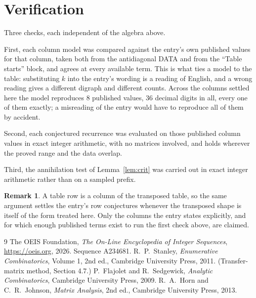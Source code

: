 \documentclass[11pt,a4paper]{article}
\theoremstyle{plain}
\theoremstyle{definition}
\newtheorem{remark}[theorem]{Remark}
\begin{document}
\section{Verification}

Three checks, each independent of the algebra above.

First, each column model was compared against the entry's own published values for that
column, taken both from the antidiagonal DATA and from the ``Table starts'' block, and agrees
at every available term. This is what ties a model to the table: substituting $k$ into the
entry's wording is a reading of English, and a wrong reading gives a different digraph and
different counts. Across the columns settled here the model reproduces $8$ published
values, $36$ decimal digits in all, every one of them exactly; a misreading of the entry
would have to reproduce all of them by accident.

Second, each conjectured recurrence was evaluated on those published column values in exact
integer arithmetic, with no matrices involved, and holds wherever the proved range and the
data overlap.

Third, the annihilation test of Lemma~\ref{lem:crit} was carried out in exact integer
arithmetic rather than on a sampled prefix.

\begin{remark}
A table row is a column of the transposed table, so the same argument settles the entry's row
conjectures whenever the transposed shape is itself of the form treated here. Only the columns
the entry states explicitly, and for which enough published terms exist to run the first check
above, are claimed.
\end{remark}

\begin{thebibliography}{9}
 The OEIS Foundation, \emph{The On-Line Encyclopedia of Integer
Sequences}, \url{https://oeis.org}, 2026. Sequence A234681.
 R.~P.~Stanley, \emph{Enumerative Combinatorics}, Volume 1, 2nd ed.,
Cambridge University Press, 2011. (Transfer-matrix method, Section 4.7.)
 P.~Flajolet and R.~Sedgewick, \emph{Analytic Combinatorics}, Cambridge
University Press, 2009.
 R.~A.~Horn and C.~R.~Johnson, \emph{Matrix Analysis}, 2nd ed., Cambridge
University Press, 2013.
\end{thebibliography}
\end{document}

